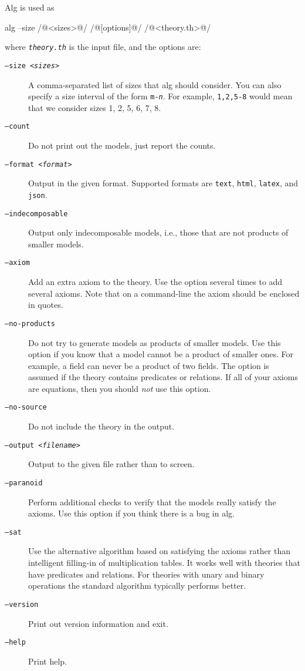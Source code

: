 \documentclass{article}
\begin{document}
Alg is used as
%
\begin{shell}
alg --size /@<sizes>@/ /@[options]@/ /@<theory.th>@/
\end{shell}
%
where \texttt{\textit{theory.th}} is the input file, and the options are:
%
\begin{description}
\item[\texttt{--size \textit{<sizes>}}]
  A comma-separated list of sizes that alg should consider. You can
  also specify a size interval of the form
  \texttt{\texttt{m}-\textit{n}}. For example, \texttt{1,2,5-8} would
  mean that we consider sizes 1, 2, 5, 6, 7, 8.
\item[\texttt{--count}]
  Do not print out the models, just report the counts.
\item[\texttt{--format \textit{<format>}}]
  Output in the given format. Supported formats are \texttt{text},
  \texttt{html}, \texttt{latex}, and \texttt{json}.
\item[\texttt{--indecomposable}]
  Output only indecomposable models, i.e., those that are not products
  of smaller models.
\item[\texttt{--axiom}]
  Add an extra axiom to the theory. Use the option several times to
  add several axioms. Note that on a command-line the axiom
  should be enclosed in quotes.
\item[\texttt{--no-products}] Do not try to generate models as
  products of smaller models. Use this option if you know that a model
  cannot be a product of smaller ones. For example, a field can never
  be a product of two fields. The option is assumed if the theory
  contains predicates or relations. If all of your axioms are
  equations, then you should \emph{not} use this option.
\item[\texttt{--no-source}]
  Do not include the theory in the output.
\item[\texttt{--output \textit{<filename>}}]
  Output to the given file rather than to screen.
\item[\texttt{--paranoid}]
  Perform additional checks to verify that the models really satisfy
  the axioms. Use this option if you think there is a bug in alg.
\item[\texttt{--sat}]
  Use the alternative algorithm based on satisfying the axioms rather
  than intelligent filling-in of multiplication tables. It works well
  with theories that have predicates and relations. For theories with
  unary and binary operations the standard algorithm typically
  performs better.
\item[\texttt{--version}]
  Print out version information and exit.
\item[\texttt{--help}]
  Print help.
\end{description}
\end{document}
